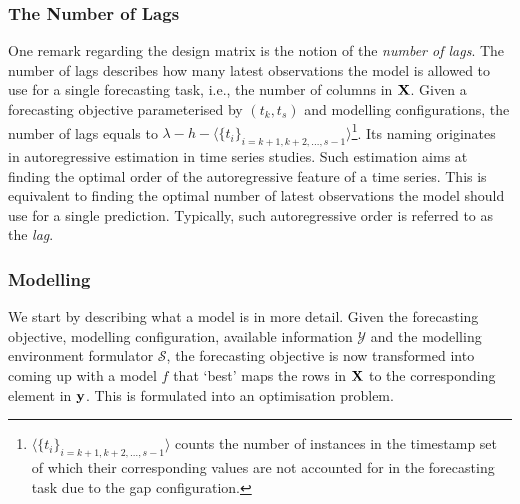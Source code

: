 \subsubsection{The Number of Lags}
One remark regarding the design matrix is the notion of the \textit{number of lags}. The number of lags describes how many latest observations the model is allowed to use for a single forecasting task, i.e., the number of columns in $\mathbf{X}$. Given a forecasting objective parameterised by $(t_k, t_s)$ and modelling configurations, the number of lags equals to $\lambda - h - \langle \{ t_i\}_{i = k+1, k+2, \ldots, s-1} \rangle$\footnote{$\langle \{ t_i\}_{i = k+1, k+2, \ldots, s-1} \rangle$ counts the number of instances in the timestamp set of which their corresponding values are not accounted for in the forecasting task due to the gap configuration.}. Its naming originates in autoregressive estimation in time series studies. Such estimation aims at finding the optimal order of the autoregressive feature of a time series. This is equivalent to finding the optimal number of latest observations the model should use for a single prediction. Typically, such autoregressive order is referred to as the \textit{lag}.

\subsubsection{Modelling}
We start by describing what a model is in more detail. Given the forecasting objective, modelling configuration, available information $\mathcal{Y}$ and the modelling environment formulator $\mathcal{S}$, the forecasting objective is now transformed into coming up with a model $f$ that `best' maps the rows in $\mathbf{X}$ to the corresponding element in $\mathbf{y}$. This is formulated into an optimisation problem.


